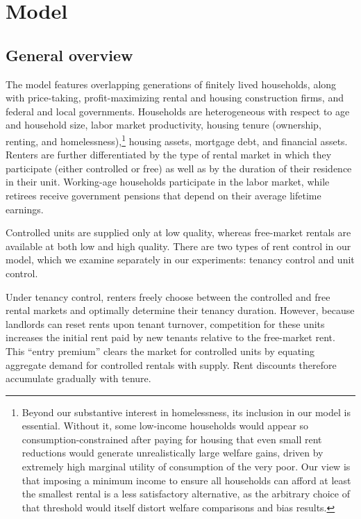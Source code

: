 \documentclass[parskip=full]{article}
\begin{document}
\section{Model}\label{sec:model}

\subsection{General overview}\label{sec:brief_overview}

The model features overlapping generations of finitely lived households, along with price-taking, profit-maximizing rental and housing construction firms, and federal and local governments. Households are heterogeneous with respect to age and household size, labor market productivity, housing tenure (ownership, renting, and homelessness),\footnote{Beyond our substantive interest in homelessness, its inclusion in our model is essential. Without it, some low-income households would appear so consumption-constrained after paying for housing that even small rent reductions would generate unrealistically large welfare gains, driven by extremely high marginal utility of consumption of the very poor. Our view is that imposing a minimum income to ensure all households can afford at least the smallest rental is a less satisfactory alternative, as the arbitrary choice of that threshold would itself distort welfare comparisons and bias results.} housing assets, mortgage debt, and financial assets. Renters are further differentiated by the type of rental market in which they participate (either controlled or free) as well as by the duration of their residence in their unit. Working-age households participate in the labor market, while retirees receive government pensions that depend on their average lifetime earnings.

Controlled units are supplied only at low quality, whereas free-market rentals are available at both low and high quality. There are two types of rent control in our model, which we examine separately in our experiments: tenancy control and unit control.

Under tenancy control, renters freely choose between the controlled and free rental markets and optimally determine their tenancy duration. However, because landlords can reset rents upon tenant turnover, competition for these units increases the initial rent paid by new tenants relative to the free-market rent. This ``entry premium'' clears the market for controlled units by equating aggregate demand for controlled rentals with supply. Rent discounts therefore accumulate gradually with tenure.
\end{document}
